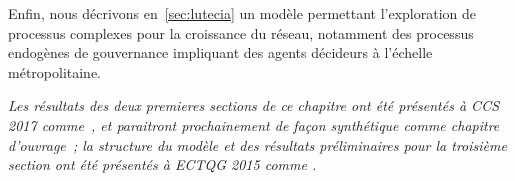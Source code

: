 Enfin, nous décrivons en~\ref{sec:lutecia} un modèle permettant l'exploration de processus complexes pour la croissance du réseau, notamment des processus endogènes de gouvernance impliquant des agents décideurs à l'échelle métropolitaine.




\stars


\textit{Les résultats des deux premieres sections de ce chapitre ont été présentés à CCS 2017 comme~\cite{raimbault:halshs-01590624}, et paraitront prochainement de façon synthétique comme chapitre d'ouvrage~\cite{raimbault2018urban}; la structure du modèle et des résultats préliminaires pour la troisième section ont été présentés à ECTQG 2015 comme \cite{le2015modeling}.}







